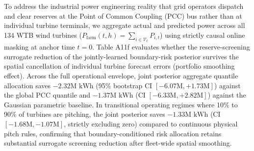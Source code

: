 \documentclass[
  journal]{IEEEtran}
\begin{document}
To address the industrial power engineering reality that grid operators
dispatch and clear reserves at the Point of Common Coupling (PCC) bus
rather than at individual turbine terminals, we aggregate actual and
predicted power across all 134 WTB wind turbines
(\(P_{\mathrm{farm}}(t, h) = \sum_{i \in \mathcal{V}_t} P_{i,t}\)) using
strictly causal online masking at anchor time \(t=0\). Table A11f
evaluates whether the reserve-screening surrogate reduction of the
jointly-learned boundary-risk posterior survives the spatial
cancellation of individual turbine forecast errors (portfolio smoothing
effect). Across the full operational envelope, joint posterior aggregate
quantile allocation saves \(-2.32\text{M kWh}\) (95\% bootstrap CI
\([-6.07\text{M}, +1.73\text{M}]\)) against the global PCC quantile and
\(-1.37\text{M kWh}\) (CI \([-6.33\text{M}, +2.82\text{M}]\)) against
the Gaussian parametric baseline. In transitional operating regimes
where 10\% to 90\% of turbines are pitching, the joint posterior saves
\(-1.33\text{M kWh}\) (CI \([-1.68\text{M}, -1.07\text{M}]\), strictly
excluding zero) compared to continuous physical pitch rules, confirming
that boundary-conditioned risk allocation retains substantial surrogate
screening reduction after fleet-wide spatial smoothing.
\end{document}
